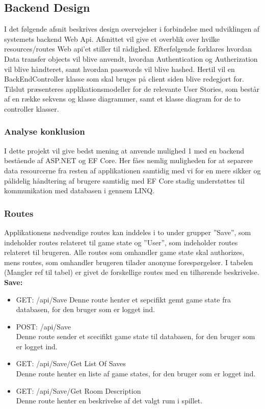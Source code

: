 \subsection{Backend Design}

I det følgende afsnit beskrives design overvejelser i forbindelse med udviklingen af systemets backend Web Api. Afsnittet vil give et overblik over hvilke resources/routes Web api’et stiller til rådighed. Efterfølgende forklares hvordan Data transfer objects vil blive anvendt, hvordan Authentication og Autherization vil blive håndteret, samt hvordan passwords vil blive hashed. Hertil vil en BackEndController klasse som skal bruges på client siden blive redegjort for. Tilslut præsenteres applikationsmodeller for de relevante User Stories, som består af en række sekvens og klasse diagrammer, samt et klasse diagram for de to controller klasser.\\

\subsubsection{Analyse konklusion}
I dette projekt vil give bedst mening at anvende mulighed 1 med en backend bestående af ASP.NET og EF Core. Her fåes nemlig muligheden for at separere data resourcerne fra resten af applikationen samtidig med vi for en mere sikker og pålidelig håndtering af brugere samtidig med EF Core stadig understøttes til kommunikation med databasen i gennem LINQ.\\

\subsubsection{Routes}
Applikationens nødvendige routes kan inddeles i to under grupper ”Save”, som indeholder routes relateret til game state og ”User”, som indeholder routes relateret til brugeren. Alle routes som omhandler game state skal authorizes, mens routes, som omhandler brugeren tilader anonyme forespørgelser. I tabelen (Mangler ref til tabel) er givet de forskellige routes med en tilhørende beskrivelse.\\

\textbf{Save:}\\
\begin{itemize}
\item GET: /api/Save
Denne route henter et sepcifikt gemt game state fra databasen, for den bruger som er logget ind.
\item POST: /api/Save\\
Denne route sender et scecifikt game state til databasen, for den bruger som er logget ind.
\item GET: /api/Save/Get List Of Saves\\
Denne route henter en liste af game states, for den bruger som er logget ind. 
\item GET: /api/Save/Get Room Description\\
Denne route henter en beskrivelse af det valgt rum i spillet.
\end{itemize}

